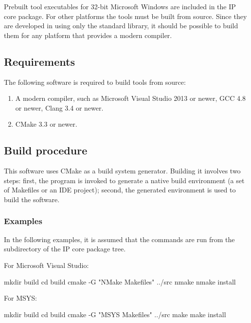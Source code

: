 \documentclass[a4paper,12pt,twoside,extrafontsizes]{memoir}
\begin{document}
Prebuilt tool executables for 32-bit Microsoft\textregistered{} Windows\textregistered{} are included in the \lxp{} IP core package. For other platforms the tools must be built from source. Since they are developed in \cplusplus{} using only the standard library, it should be possible to build them for any platform that provides a modern \cplusplus{} compiler.

\subsection{Requirements}

The following software is required to build \lxp{} tools from source:

\begin{enumerate}
	\item A modern \cplusplus{} compiler, such as Microsoft\textregistered{} Visual Studio\textregistered{} 2013 or newer, GCC 4.8 or newer, Clang 3.4 or newer.
	\item CMake 3.3 or newer.
\end{enumerate}

\subsection{Build procedure}

This software uses CMake as a build system generator. Building it involves two steps: first, the  program is invoked to generate a native build environment (a set of Makefiles or an IDE project); second, the generated environment is used to build the software.

\subsubsection{Examples}

In the following examples, it is assumed that the commands are run from the  subdirectory of the \lxp{} IP core package tree.

For Microsoft\textregistered{} Visual Studio\textregistered{}:

\begin{codepar}
    mkdir build
    cd build
    cmake -G "NMake Makefiles" ../src
    nmake
    nmake install
\end{codepar}

For MSYS:

\begin{codepar}
    mkdir build
    cd build
    cmake -G "MSYS Makefiles" ../src
    make
    make install
\end{codepar}
\end{document}
